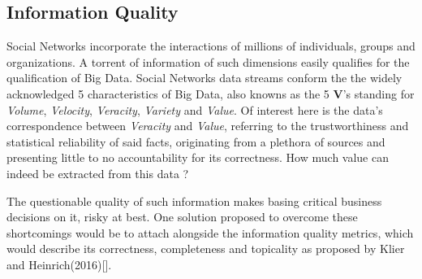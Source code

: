 	\subsection{Information Quality}
		Social Networks incorporate the interactions of millions of individuals, groups and organizations. A torrent of information of such dimensions easily qualifies for the qualification of Big Data. Social Networks data streams conform the the widely acknowledged 5 characteristics of Big Data, also knowns as the 5 \textbf{V}'s\cite{bigdata} standing for \textit{Volume}, \textit{Velocity}, \textit{Veracity}, \textit{Variety} and \textit{Value}. Of interest here is the data's correspondence between \textit{Veracity} and \textit{Value}, referring to the trustworthiness and statistical reliability of said facts, originating from a plethora of sources and presenting little to no accountability for its correctness. How much value can indeed be extracted from this data ?
		\par
		The questionable quality of such information makes basing critical business decisions on it, risky at best. One solution proposed to overcome these shortcomings would be to attach alongside the information quality metrics, which would describe its correctness, completeness and topicality as proposed by Klier and Heinrich(2016)[\cite{klier2016datenqualitat}].